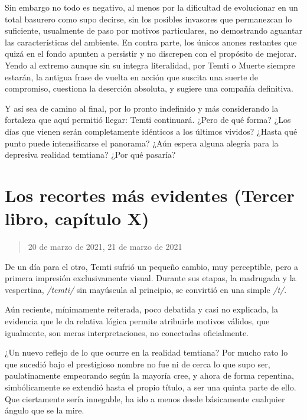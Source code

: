 \documentclass[
]{book}
\begin{document}
Sin embargo no todo es negativo, al menos por la dificultad de evolucionar en un total basurero como supo decirse, sin los posibles invasores que permanezcan lo suficiente, usualmente de paso por motivos particulares, no demostrando aguantar las características del ambiente. En contra parte, los únicos anones restantes que quizá en el fondo apunten a persistir y no discrepen con el propósito de mejorar. Yendo al extremo aunque sin su integra literalidad, por Temti o Muerte siempre estarán, la antigua frase de vuelta en acción que suscita una suerte de compromiso, cuestiona la deserción absoluta, y sugiere una compañía definitiva.

Y así sea de camino al final, por lo pronto indefinido y más considerando la fortaleza que aquí permitió llegar: Temti continuará. ¿Pero de qué forma? ¿Los días que vienen serán completamente idénticos a los últimos vividos? ¿Hasta qué punto puede intensificarse el panorama? ¿Aún espera alguna alegría para la depresiva realidad temtiana? ¿Por qué pasaría?

\hypertarget{los-recortes-muxe1s-evidentes-tercer-libro-capuxedtulo-x}{%
\section{Los recortes más evidentes (Tercer libro, capítulo X)}\label{los-recortes-muxe1s-evidentes-tercer-libro-capuxedtulo-x}}

\begin{quote}
20 de marzo de 2021, 21 de marzo de 2021
\end{quote}

De un día para el otro, Temti sufrió un pequeño cambio, muy perceptible, pero a primera impresión exclusivamente visual. Durante sus etapas, la madrugada y la vespertina, \emph{/temti/} sin mayúscula al principio, se convirtió en una simple \emph{/t/}.

Aún reciente, mínimamente reiterada, poco debatida y casi no explicada, la evidencia que le da relativa lógica permite atribuirle motivos válidos, que igualmente, son meras interpretaciones, no conectadas oficialmente.

¿Un nuevo reflejo de lo que ocurre en la realidad temtiana? Por mucho rato lo que sucedió bajo el prestigioso nombre no fue ni de cerca lo que supo ser, paulatinamente empeorando según la mayoría cree, y ahora de forma repentina, simbólicamente se extendió hasta el propio título, a ser una quinta parte de ello. Que ciertamente sería innegable, ha ido a menos desde básicamente cualquier ángulo que se la mire.
\end{document}
